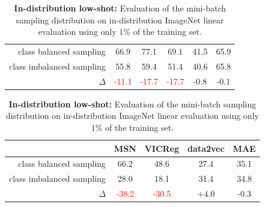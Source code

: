 \documentclass{article} %
\begin{document}
\begin{table}[h]
\begin{tabular}{r|ccccc}
        \toprule\toprule
        class balanced sampling & 66.9 & 77.1 & 69.1 & 41.5 & 65.9 \\
        class imbalanced sampling & 55.8 & 59.4 & 51.4 & 40.6 & 65.8 \\
        $\Delta$ & \textcolor{red}{-11.1} & \textcolor{red}{-17.7} & \textcolor{red}{-17.7} & -0.8 & -0.1
    \end{tabular}
    \vspace{1.5em}
    \centering
    \footnotesize
    \caption{\textbf{In-distribution low-shot:} Evaluation of the mini-batch sampling distribution on in-distribution ImageNet linear evaluation using only $1\%$ of the training set.}
    \label{tb:indistribution_lowshot}
    \begin{tabular}{r|cccc}
        \toprule
        & MSN & VICReg & data2vec & MAE \\
        \toprule\toprule
        class balanced sampling & 66.2 & 48.6 & 27.4 & 35.1 \\
        class imbalanced sampling & 28.0 & 18.1 & 31.4 & 34.8 \\
        $\Delta$ & \textcolor{red}{-38.2} & \textcolor{red}{-30.5} & +4.0 & -0.3
    \end{tabular}
\end{table}
\end{document}
